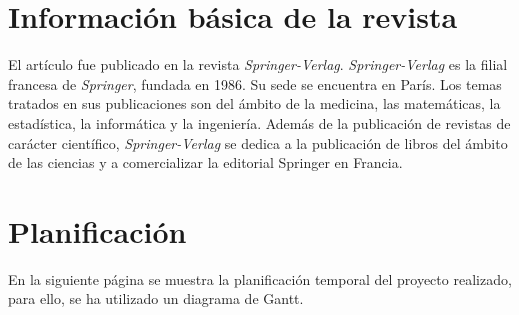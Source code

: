 \documentclass[a4paper,11pt]{report}
\begin{document}
\section{Información básica de la revista}

El artículo fue publicado en la revista \emph{Springer-Verlag}. \emph{Springer-Verlag} es la filial francesa de \emph{Springer}, fundada en 1986. Su sede se encuentra en París. Los temas tratados en sus publicaciones son del ámbito de la medicina, las matemáticas, la estadística, la informática y la ingeniería. Además de la publicación de revistas de carácter científico, \emph{Springer-Verlag} se dedica a la publicación de libros del ámbito de las ciencias y a comercializar la editorial Springer en Francia. 


\section{Planificación} \label{planificacion}

En la siguiente página se muestra la planificación temporal del proyecto realizado, para ello, se ha utilizado un diagrama de Gantt.
\end{document}
